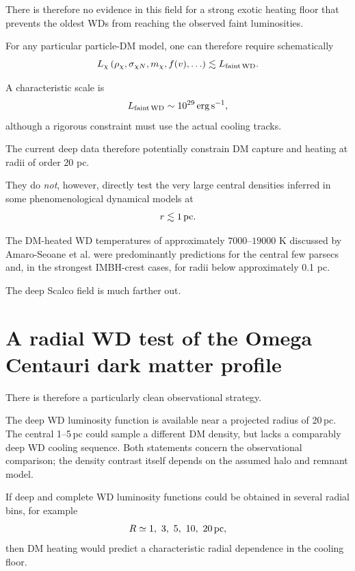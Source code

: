 \documentclass[11pt,a4paper]{article}
\begin{document}
There is therefore no evidence in this field for a strong exotic heating floor that prevents the oldest WDs from reaching the observed faint luminosities.

For any particular particle-DM model, one can therefore require schematically
\begin{equation}
L_\chi
\left(
\rho_\chi,
\sigma_{\chi N},
m_\chi,
f(v),
\ldots
\right)
\lesssim
L_{\rm faint\,WD}.
\end{equation}

A characteristic scale is
\begin{equation}
L_{\rm faint\,WD}
\sim10^{29}\,{\rm erg\,s^{-1}},
\end{equation}
although a rigorous constraint must use the actual cooling tracks.

The current deep data therefore potentially constrain DM capture and heating at radii of order 20 pc.

They do \emph{not}, however, directly test the very large central densities inferred in some phenomenological dynamical models at
\begin{equation}
r\lesssim1\,{\rm pc}.
\end{equation}

The DM-heated WD temperatures of approximately $7000$--$19000$ K discussed by Amaro-Seoane et al. were predominantly predictions for the central few parsecs and, in the strongest IMBH-crest cases, for radii below approximately 0.1 pc.

The deep Scalco field is much farther out.


\section{A radial WD test of the Omega Centauri dark matter profile}

There is therefore a particularly clean observational strategy.

The deep WD luminosity function is available near a projected radius of 20\,pc.
The central 1--5\,pc could sample a different DM density, but lacks a comparably deep
WD cooling sequence. Both statements concern the observational comparison; the density
contrast itself depends on the assumed halo and remnant model.

If deep and complete WD luminosity functions could be obtained in several radial bins, for example
\begin{equation}
R\simeq1,\ 3,\ 5,\ 10,\ 20\,{\rm pc},
\end{equation}
then DM heating would predict a characteristic radial dependence in the cooling floor.
\end{document}
